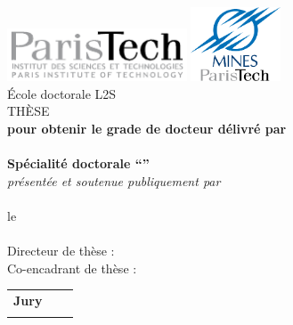 \AddToShipoutPicture*{\BackgroundPic}
\AddToShipoutPicture*{\EtiquetteThese}
\makeatletter
  \begin{titlepage}
  \centering
      \includegraphics[width=0.4\textwidth]{ParisTech-Institute.pdf}
      \hfill
      \includegraphics[width=0.2\textwidth]{Mines.pdf}\\
    \vspace{1cm}
      {\Large \'{E}cole doctorale L2S}\\
    \vspace{1cm}
      {\huge 
    \vspace{0.5cm}
      	TH\`{E}SE}\\
    \vspace{1cm}
   		\textbf{pour obtenir le grade de docteur délivré par}\\
    \vspace{1cm}
    	{\huge\textbf{\@ecole}}\\
    \vspace{0.5cm}
    	{\Large\textbf{Spécialité doctorale ``\@specialite''}}\\
    \vspace{2cm}
    	\textit{présentée et soutenue publiquement par}\\
    \vspace{0.5cm}
    	{\Large \textbf{\@author}} \\
    \vspace{0.5cm}
    	le \@date \\
    \vfill
       {\LARGE \color[rgb]{0,0,1} \textbf{\@title}} \\
    \vfill
        Directeur de thèse : \textbf{\@directeur}\\
        Co-encadrant de thèse : \textbf{\@encadrant}\\
    \vfill
	\begin{tabular}{>{\bfseries}llr}
		\large Jury\\
		\@jurya
		\@juryb
		\@juryc
		\@juryd
		\@jurye
		\@juryf
		\@juryg
		\@juryh
		\@juryi
	\end{tabular}
	\vfill
	

  \end{titlepage}




  
  
  
\makeatother